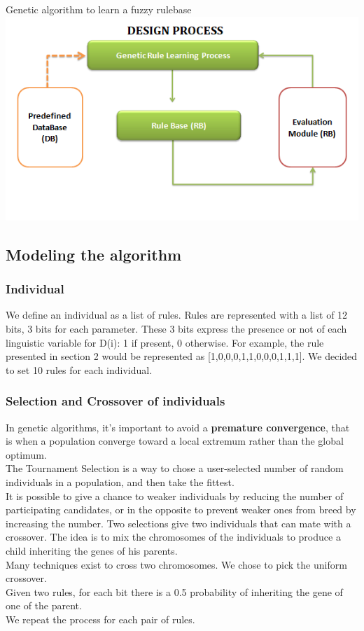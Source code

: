 \documentclass[a4paper,12pt]{article}
\begin{document}
\begin{center}
Genetic algorithm to learn a fuzzy rulebase
\includegraphics[scale=0.5]{genefuzzy}
\end{center}


\subsection{Modeling the algorithm}

\subsubsection{Individual}

We define an individual as a list of rules. Rules are represented with a list of 12 bits, 3 bits for each parameter.
These 3 bits express the presence or not of each linguistic variable for D(i): 1 if present, 0 otherwise.
For example, the rule presented in section 2 would be represented as [1,0,0,0,1,1,0,0,0,1,1,1].
We decided to set 10 rules for each individual.

\subsubsection{Selection and Crossover of individuals}

In genetic algorithms, it's important to avoid a \textbf{premature convergence}, that is when a population converge toward a local extremum rather than the global optimum. \\
The Tournament Selection is a way to chose a user-selected number of random individuals in a population, and then take the fittest.\\
It is possible to give a chance to weaker individuals by reducing the number of participating candidates, or in the opposite to prevent weaker ones from breed by increasing the number.
Two selections give two individuals that can mate with a crossover.
The idea is to mix the chromosomes of the individuals to produce a child inheriting the genes of his parents.\\
Many techniques exist to cross two chromosomes. We chose to pick the uniform crossover.\\
Given two rules, for each bit there is a 0.5 probability of inheriting the gene of one of the parent.\\
We repeat the process for each pair of rules.
\end{document}
